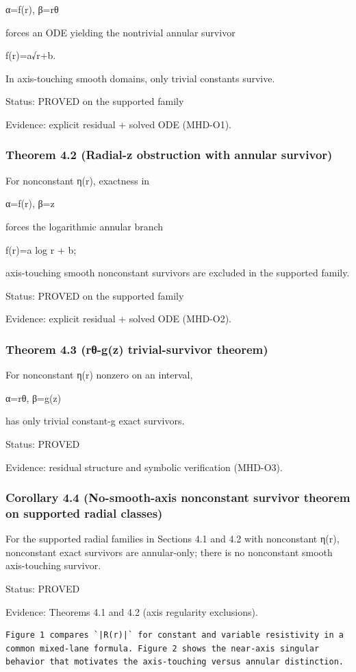 \documentclass[11pt]{article}
\begin{document}
α=f(r), β=rθ

forces an ODE yielding the nontrivial annular survivor

f(r)=a√r+b.

In axis-touching smooth domains, only trivial constants survive.


Status: PROVED on the supported family

Evidence: explicit residual + solved ODE (MHD-O1).


\subsubsection*{Theorem 4.2 (Radial-z obstruction with annular survivor)}
For nonconstant η(r), exactness in

α=f(r), β=z

forces the logarithmic annular branch

f(r)=a log r + b;

axis-touching smooth nonconstant survivors are excluded in the supported family.


Status: PROVED on the supported family

Evidence: explicit residual + solved ODE (MHD-O2).


\subsubsection*{Theorem 4.3 (rθ-g(z) trivial-survivor theorem)}
For nonconstant η(r) nonzero on an interval,

α=rθ, β=g(z)

has only trivial constant-g exact survivors.


Status: PROVED

Evidence: residual structure and symbolic verification (MHD-O3).


\subsubsection*{Corollary 4.4 (No-smooth-axis nonconstant survivor theorem on supported radial classes)}
For the supported radial families in Sections 4.1 and 4.2 with nonconstant η(r), nonconstant exact survivors are annular-only; there is no nonconstant smooth axis-touching survivor.


Status: PROVED

Evidence: Theorems 4.1 and 4.2 (axis regularity exclusions).


\begin{verbatim}
Figure 1 compares `|R(r)|` for constant and variable resistivity in a common mixed-lane formula. Figure 2 shows the near-axis singular behavior that motivates the axis-touching versus annular distinction.
\end{verbatim}
\end{document}
